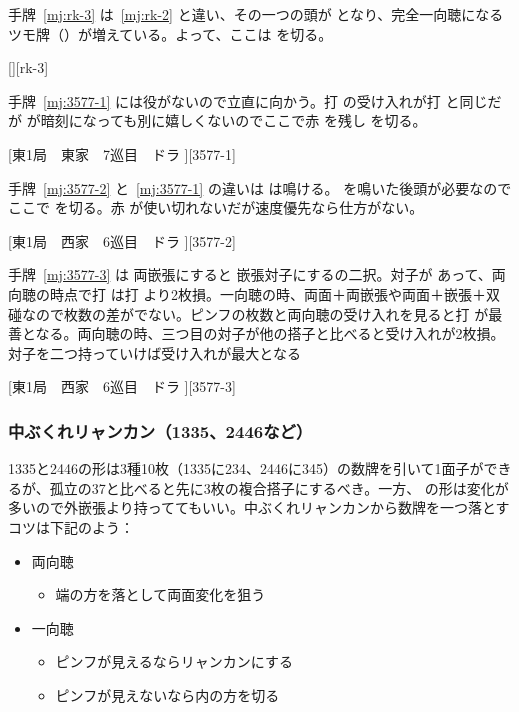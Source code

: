 \documentclass[../nankiru_main.tex]{subfiles}
\begin{document}
手牌~\ref{mj:rk-3} は~\ref{mj:rk-2} と違い、その一つの頭が  となり、完全一向聴になるツモ牌（）が増えている。よって、ここは  を切る\citep[][p. 88]{uzaku-haikouritsu}。

[][rk-3]

手牌~\ref{mj:3577-1} には役がないので立直に向かう。打  の受け入れが打  と同じだが  が暗刻になっても別に嬉しくないのでここで赤  を残し  を切る\citep[][p.~26]{uzaku-nankiru}。

[東1局　東家　7巡目　ドラ ][3577-1]

手牌~\ref{mj:3577-2} と~\ref{mj:3577-1} の違いは  は鳴ける。 を鳴いた後頭が必要なのでここで  を切る。赤  が使い切れないだが速度優先なら仕方がない\citep[][p.~26]{uzaku-nankiru}。

[東1局　西家　6巡目　ドラ ][3577-2]

手牌~\ref{mj:3577-3} は  両嵌張にすると  嵌張対子にするの二択。対子が  あって、両向聴の時点で打  は打  より2枚損。一向聴の時、両面＋両嵌張や両面＋嵌張＋双碰なので枚数の差がでない。ピンフの枚数と両向聴の受け入れを見ると打  が最善となる\citep{zundamon-3head}。両向聴の時、三つ目の対子が他の搭子と比べると受け入れが2枚損。対子を二つ持っていけば受け入れが最大となる

[東1局　西家　6巡目　ドラ ][3577-3]


\subsubsection*{中ぶくれリャンカン（1335、2446など）}

1335と2446の形は3種10枚（1335に234、2446に345）の数牌を引いて1面子ができるが、孤立の37と比べると先に3枚の複合搭子にするべき\citep{chirno-kanchan}。一方、 の形は変化が多いので外嵌張より持っててもいい。中ぶくれリャンカンから数牌を一つ落とすコツは下記のよう：

\begin{itemize}
  \item 両向聴
  \begin{itemize}
    \item 端の方を落として両面変化を狙う
  \end{itemize}
  \item 一向聴
  \begin{itemize}
    \item ピンフが見えるならリャンカンにする
    \item ピンフが見えないなら内の方を切る
  \end{itemize}
\end{itemize}
\end{document}
